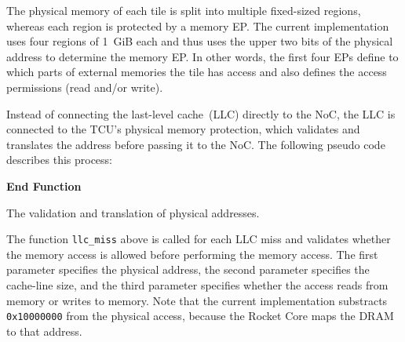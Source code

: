 The physical memory of each tile is split into multiple fixed-sized regions, whereas each region is
protected by a memory EP. The current implementation uses four regions of 1~GiB each and thus uses
the upper two bits of the physical address to determine the memory EP. In other words, the first
four EPs define to which parts of external memories the tile has access and also defines the access
permissions (read and/or write).

Instead of connecting the last-level cache~(LLC) directly to the NoC, the LLC is connected to the
TCU's physical memory protection, which validates and translates the address before passing it to
the NoC. The following pseudo code describes this process:\\[.2em]

\begin{algorithm}[H]
    \textbf{End Function}
    \caption{The validation and translation of physical addresses.}
    \label{code:pmp}
\end{algorithm}

\noindent The function \texttt{llc\_miss} above is called for each LLC miss and validates whether
the memory access is allowed before performing the memory access. The first parameter specifies the
physical address, the second parameter specifies the cache-line size, and the third parameter
specifies whether the access reads from memory or writes to memory. Note that the current
implementation substracts \texttt{0x10000000} from the physical access, because the Rocket Core maps
the DRAM to that address.
\extend{}

